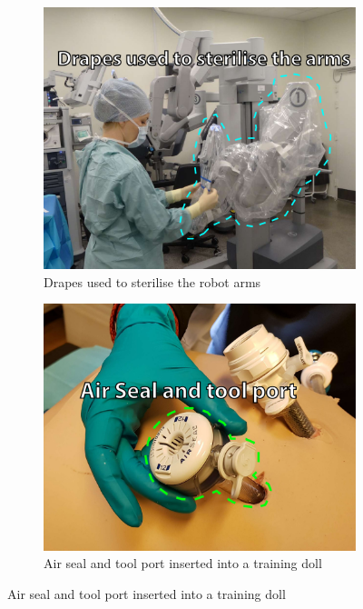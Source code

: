 \documentclass[conference]{IEEEtran}
\begin{document}



\begin{figure}[H]
	\centering
	\begin{subfigure}[b]{0.48\textwidth}
		\includegraphics[width=\textwidth]{Figures/drapes.pdf}
		\caption{Drapes used to sterilise the robot arms}
		\label{fig:drapes}
	\end{subfigure}	
	
	\begin{subfigure}[b]{0.48\textwidth}
		\includegraphics[width=\textwidth]{Figures/port.pdf}
		\caption{Air seal and tool port inserted into a training doll}
		\label{fig:port}
	\end{subfigure}


\end{figure}
\end{document}
